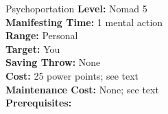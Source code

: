 {Psychoportation}
{
	\textbf{Level:}
	Nomad 5\\
	\textbf{Manifesting Time:}
	1 mental action\\
	\textbf{Range:}
	Personal\\
	\textbf{Target:}
	You\\
	\textbf{Saving Throw:}
	None\\
	\textbf{Cost:}
	25 power points; see text\\
	\textbf{Maintenance Cost:}
	None; see text\\
	\textbf{Prerequisites:}
	\\
}
